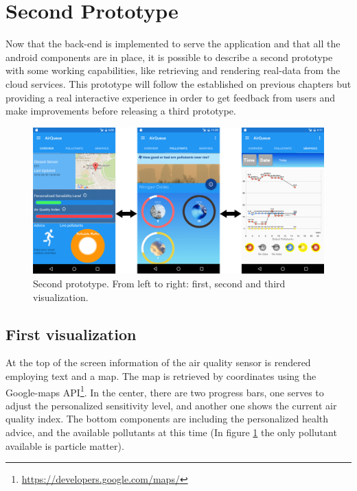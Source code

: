 \section{Second Prototype}
Now that the back-end is implemented to serve the application and that all the android components are in place, it is possible to describe a second prototype with some working capabilities, like retrieving and rendering real-data from the cloud services. This prototype will follow the established on previous chapters but providing a real interactive experience in order to get feedback from users and make improvements before releasing a third prototype. 

\begin{figure}[H]
\begin{adjustbox}{width=1.2\textwidth,center=\textwidth}
  \centering
  \includegraphics[scale=1]{images/secondPrototype.png}
\end{adjustbox}
  \caption[Second prototype]{Second prototype. From left to right: first, second and third visualization.}
  \label{fig:first_second_prototype}
\end{figure}

\subsection{First visualization}
At the top of the screen information of the air quality sensor is rendered employing text and a map. The map is retrieved by coordinates using the Google-maps API\footnote{\url{https://developers.google.com/maps/}}. In the center, there are two progress bars, one serves to adjust the personalized sensitivity level, and another one shows the current air quality index. The bottom components are including the personalized health advice, and the available pollutants at this time (In figure \ref{fig:first_second_prototype} the only pollutant available is particle matter). 


